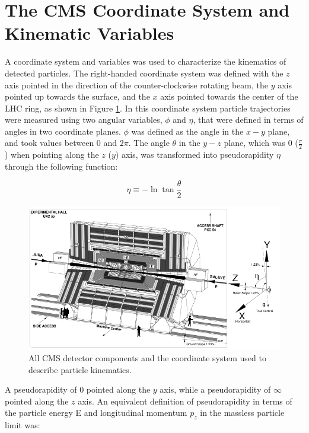 \section{The CMS Coordinate System and Kinematic Variables}
\label{sec:coordinateSystemAndKinematicVars}
A coordinate system and variables was used to characterize the kinematics of detected particles.  
The right-handed coordinate system was defined with the $z$ axis pointed in the direction 
of the counter-clockwise rotating beam, the $y$ axis pointed up towards the surface, and the $x$ axis pointed towards 
the center of the LHC ring, as shown in Figure \ref{fig:cmsAndCoordinateSystem}.  In this coordinate system particle 
trajectories were measured using two angular variables, $\phi$ and $\eta$, that were defined in terms of angles 
in two coordinate planes.  $\phi$ was defined as the angle in the $x-y$ plane, and took values between 0 and $2\pi$.  
The angle $\theta$ in the $y-z$ plane, which was 0 ($\frac{\pi}{2}$) when pointing along the $z$ ($y$) axis, was 
transformed into pseudorapidity $\eta$ through the following function:

\begin{equation}
	\eta \equiv -\ln{\tan{\frac{\theta}{2}}}
\end{equation}


\begin{figure}[ht]
	\centering
	\includegraphics[width=1\textwidth]{figures/cmsDetectorAndCoordinateSystem.png}
	\caption{All CMS detector components and the coordinate system used to describe particle kinematics.}
	\label{fig:cmsAndCoordinateSystem}
\end{figure}


A pseudorapidity of 0 pointed along the $y$ axis, while a pseudorapidity of $\infty$ pointed along the $z$ axis.
An equivalent definition of pseudorapidity in terms of the particle energy E and longitudinal 
momentum $p_{z}$ in the massless particle limit was:

